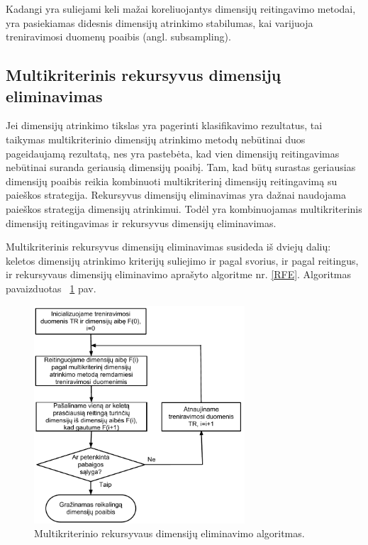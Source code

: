 Kadangi yra suliejami keli mažai koreliuojantys dimensijų reitingavimo metodai,
yra pasiekiamas didesnis dimensijų atrinkimo stabilumas, kai varijuoja 
treniravimosi duomenų poaibis (angl. subsampling).

\subsection{Multikriterinis rekursyvus dimensijų eliminavimas}

Jei dimensijų atrinkimo tikslas yra pagerinti klasifikavimo rezultatus, tai taikymas
multikriterinio dimensijų atrinkimo metodų nebūtinai duos pageidaujamą rezultatą,
nes yra pastebėta, kad vien dimensijų reitingavimas nebūtinai suranda geriausią dimensijų 
poaibį. Tam, kad būtų surastas geriausias dimensijų poaibis reikia kombinuoti
multikriterinį dimensijų reitingavimą su paieškos strategija. Rekursyvus 
dimensijų eliminavimas yra dažnai naudojama paieškos strategija dimensijų
atrinkimui. Todėl yra kombinuojamas multikriterinis dimensijų reitingavimas ir
rekursyvus dimensijų eliminavimas.

Multikriterinis rekursyvus dimensijų eliminavimas\cite{yang2011robust} susideda iš dviejų
dalių: keletos dimensijų atrinkimo kriterijų suliejimo ir pagal svorius, ir 
pagal reitingus, ir rekursyvaus dimensijų eliminavimo aprašyto algoritme 
nr. \ref{RFE}. Algoritmas pavaizduotas ~\ref{fig:figure6} pav.
\begin{figure}
 \centering
 \includegraphics[width=0.7\textwidth]{images/mcf-rfe_procedure.pdf}
 \caption{Multikriterinio rekursyvaus dimensijų eliminavimo algoritmas.}
 \label{fig:figure6}
\end{figure}

